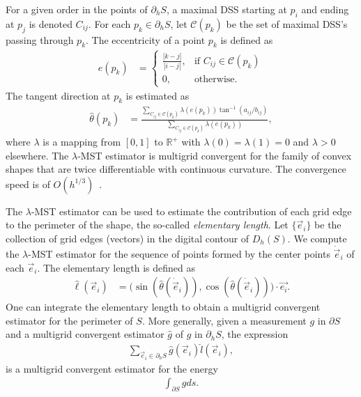 For a given order in the points of $\partial_h S$, a maximal DSS starting at $p_i$ and ending at $p_j$ is denoted $C_{ij}$. For each $p_k \in \partial_h S$, let $\mathcal{C}(p_k)$ be the set of maximal DSS's passing through $p_k$. The eccentricity of a point $p_k$ is defined as
\begin{align*}
	e(p_k) &= \left\{ \begin{array}{cc}
	\frac{|k-j|}{|i-j|}, & \text{if } C_{ij} \in \mathcal{C}(p_k) \\
	0, & \text{otherwise}.
	\end{array}\right.
\end{align*}
%
The tangent direction at $p_k$ is estimated as
\begin{align*}
	\hat{\theta}(p_k) &= \frac{ \sum_{C_{ij} \in \mathcal{C}(p_k) }{ \lambda( e(p_k) ) \tan^{-1}(a_{ij}/b_{ij}) } }{ \sum_{C_{ij} \in \mathcal{C}(p_k) }{ \lambda( e(p_k) )} },
\end{align*}
%
where $\lambda$ is a mapping from $[0,1]$ to $\mathbb{R}^+$ with $\lambda(0)=\lambda(1)=0$ and $\lambda > 0$ elsewhere. The $\lambda$-MST estimator is multigrid convergent for the family of convex shapes that are twice differentiable with continuous curvature. The convergence speed is of $O(h^{1/3})$~\cite{lachaud07tangent}.

The $\lambda$-MST estimator can be used to estimate the contribution of each grid edge to the perimeter of the shape, the so-called \emph{elementary length}. Let $\{\vec{e}_i\}$ be the collection of grid edges (vectors) in the digital contour of $D_h(S)$. We compute the $\lambda$-MST estimator for the sequence of points formed by the center points $\dot{\vec{e}}_i$ of each $\vec{e}_i$. The elementary length is defined as
\begin{align*}
\hat{\ell}(\vec{e}_i) &= \big( \sin( \hat{\theta}(\dot{\vec{e}}_i) ), \cos( \hat{\theta}(\dot{\vec{e}}_i) ) \big) \cdot \vec{e_i}.
\end{align*}
%
One can integrate the elementary length to obtain a multigrid convergent estimator for the perimeter of $S$. More generally, given a measurement $g$ in $\partial S$ and a multigrid convergent estimator $\hat{g}$ of $g$ in $\partial_h S$, the expression
\begin{align*}
	\sum_{\vec{e}_i \in \partial_h S}{ \hat{g}(\vec{e}_i) \hat{l}(\vec{e}_i)},
\end{align*}
%
is a multigrid convergent estimator for the energy~\cite{lachaud06hdr}
\begin{align*}
	\int_{\partial S}{ g ds }.
\end{align*}
%
%
%
